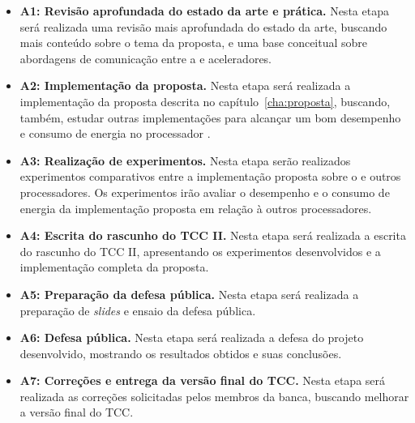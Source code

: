 \begin{itemize}
    \item \textbf{A1: Revisão aprofundada do estado da arte e prática.} Nesta etapa será
        realizada uma revisão mais aprofundada do estado da arte, buscando mais
        conteúdo sobre o tema da proposta, e uma base conceitual sobre abordagens de
        comunicação entre a \cpu e aceleradores.
    \item \textbf{A2: Implementação da proposta.} Nesta etapa será realizada a
        implementação da proposta descrita no capítulo~\ref{cha:proposta},
        buscando, também, estudar outras implementações para alcançar um bom
        desempenho e consumo de energia no processador \mppa.
    \item \textbf{A3: Realização de experimentos.} Nesta etapa serão realizados
        experimentos comparativos entre a implementação proposta sobre o \mppa e
        outros processadores. Os experimentos irão avaliar o desempenho e o consumo de
        energia da implementação proposta em relação à outros processadores.
    \item \textbf{A4: Escrita do rascunho do TCC II.} Nesta etapa será realizada
        a escrita do rascunho do TCC II, apresentando os experimentos desenvolvidos e a
        implementação completa da proposta.
    \item \textbf{A5: Preparação da defesa pública.} Nesta etapa será realizada
        a preparação de \textit{slides} e ensaio da defesa pública.
    \item \textbf{A6: Defesa pública.} Nesta etapa será realizada a defesa do
        projeto desenvolvido, mostrando os resultados obtidos e suas conclusões.
    \item \textbf{A7: Correções e entrega da versão final do TCC.} Nesta etapa
        será realizada as correções solicitadas pelos membros da banca, buscando
        melhorar a versão final do TCC.
\end{itemize}

